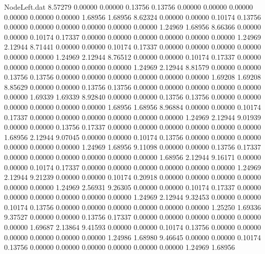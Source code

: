 \begin{filecontents}{NodeLeft.dat}
   8.57279    0.00000    0.00000     0.13756    0.13756    0.00000    0.00000    0.00000    0.00000    0.00000    0.00000    1.68956    1.68956
   8.62324    0.00000    0.00000     0.10174    0.13756    0.00000    0.00000    0.00000    0.00000    0.00000    0.00000    1.24969    1.68956
   8.66366    0.00000    0.00000     0.10174    0.17337    0.00000    0.00000    0.00000    0.00000    0.00000    0.00000    1.24969    2.12944
   8.71441    0.00000    0.00000     0.10174    0.17337    0.00000    0.00000    0.00000    0.00000    0.00000    0.00000    1.24969    2.12944
   8.76512    0.00000    0.00000     0.10174    0.17337    0.00000    0.00000    0.00000    0.00000    0.00000    0.00000    1.24969    2.12944
   8.81579    0.00000    0.00000     0.13756    0.13756    0.00000    0.00000    0.00000    0.00000    0.00000    0.00000    1.69208    1.69208
   8.85629    0.00000    0.00000     0.13756    0.13756    0.00000    0.00000    0.00000    0.00000    0.00000    0.00000    1.69339    1.69339
   8.92840    0.00000    0.00000     0.13756    0.13756    0.00000    0.00000    0.00000    0.00000    0.00000    0.00000    1.68956    1.68956
   8.96884    0.00000    0.00000     0.10174    0.17337    0.00000    0.00000    0.00000    0.00000    0.00000    0.00000    1.24969    2.12944
   9.01939    0.00000    0.00000     0.13756    0.17337    0.00000    0.00000    0.00000    0.00000    0.00000    0.00000    1.68956    2.12944
   9.07045    0.00000    0.00000     0.10174    0.13756    0.00000    0.00000    0.00000    0.00000    0.00000    0.00000    1.24969    1.68956
   9.11098    0.00000    0.00000     0.13756    0.17337    0.00000    0.00000    0.00000    0.00000    0.00000    0.00000    1.68956    2.12944
   9.16171    0.00000    0.00000     0.10174    0.17337    0.00000    0.00000    0.00000    0.00000    0.00000    0.00000    1.24969    2.12944
   9.21239    0.00000    0.00000     0.10174    0.20918    0.00000    0.00000    0.00000    0.00000    0.00000    0.00000    1.24969    2.56931
   9.26305    0.00000    0.00000     0.10174    0.17337    0.00000    0.00000    0.00000    0.00000    0.00000    0.00000    1.24969    2.12944
   9.32453    0.00000    0.00000     0.10174    0.13756    0.00000    0.00000    0.00000    0.00000    0.00000    0.00000    1.25250    1.69336
   9.37527    0.00000    0.00000     0.13756    0.17337    0.00000    0.00000    0.00000    0.00000    0.00000    0.00000    1.69687    2.13864
   9.41593    0.00000    0.00000     0.10174    0.13756    0.00000    0.00000    0.00000    0.00000    0.00000    0.00000    1.24986    1.68980
   9.46645    0.00000    0.00000     0.10174    0.13756    0.00000    0.00000    0.00000    0.00000    0.00000    0.00000    1.24969    1.68956

\end{filecontents}

